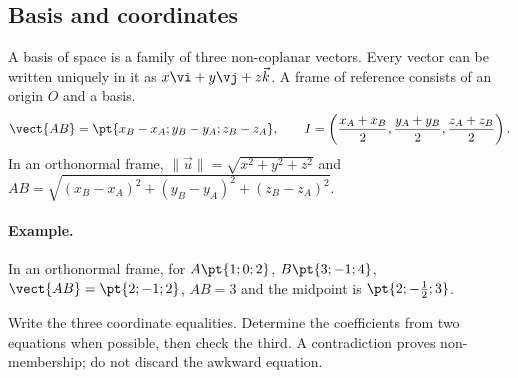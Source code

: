 \subsection{Basis and coordinates}
A basis of space is a family of three non-coplanar vectors. Every vector can be written uniquely in it as $x\vi +y\vj +z\vec k$. A frame of reference consists of an origin $O$ and a basis.
\[\vect{AB}=\pt{x_B-x_A;y_B-y_A;z_B-z_A},\qquad
I=\left(\frac{x_A+x_B}2,\frac{y_A+y_B}2,\frac{z_A+z_B}2\right).\]
In an orthonormal frame, $\|\vec u\|=\sqrt{x^2+y^2+z^2}$ and $AB=\sqrt{(x_B-x_A)^2+(y_B-y_A)^2+(z_B-z_A)^2}$.
\paragraph{Example.} In an orthonormal frame, for $A\pt{1;0;2}$, $B\pt{3;-1;4}$, $\vect{AB}=\pt{2;-1;2}$, $AB=3$ and the midpoint is $\pt{2;-\frac{1}{2};3}$.
\begin{method}
Write the three coordinate equalities. Determine the coefficients from two equations when possible, then check the third. A contradiction proves non-membership; do not discard the awkward equation.
\end{method}



\mxnewpage
